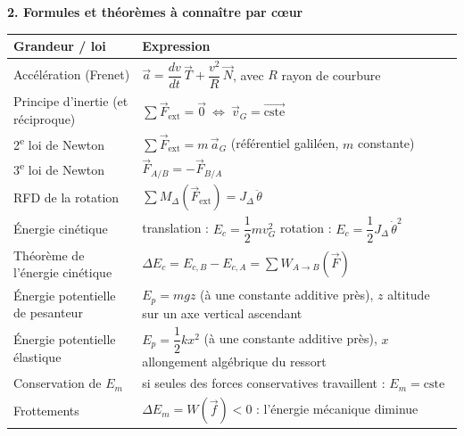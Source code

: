 \documentclass[11pt]{article}
\begin{document}
\begin{aretenir}
\textbf{2. Formules et théorèmes à connaître par c\oe ur}
\begin{center}
\begin{tabularx}{\linewidth}{|l|X|}
\hline
\rowcolor{popblueL} \textbf{Grandeur / loi} & \textbf{Expression} \\
\hline
Accélération (Frenet) & $\vec{a}=\dfrac{dv}{dt}\,\vec{T}+\dfrac{v^2}{R}\,\vec{N}$, avec $R$ rayon de courbure \\
\hline
Principe d'inertie (et réciproque) & $\sum\vec{F}_{\mathrm{ext}}=\vec{0}\ \Longleftrightarrow\ \vec{v}_G=\overrightarrow{\mathrm{cste}}$ \\
\hline
2\textsuperscript{e} loi de Newton & $\sum\vec{F}_{\mathrm{ext}}=m\,\vec{a}_G$ (référentiel galiléen, $m$ constante) \\
\hline
3\textsuperscript{e} loi de Newton & $\vec{F}_{A/B}=-\vec{F}_{B/A}$ \\
\hline
RFD de la rotation & $\sum M_\Delta(\vec{F}_{\mathrm{ext}})=J_\Delta\,\ddot{\theta}$ \\
\hline
Énergie cinétique & translation : $E_c=\dfrac12 m v_G^2$ \quad rotation : $E_c=\dfrac12 J_\Delta\,\dot{\theta}^2$ \\
\hline
Théorème de l'énergie cinétique & $\Delta E_c=E_{c,B}-E_{c,A}=\sum W_{A\to B}(\vec{F})$ \\
\hline
Énergie potentielle de pesanteur & $E_p=m g z$ (à une constante additive près), $z$ altitude sur un axe vertical ascendant \\
\hline
Énergie potentielle élastique & $E_p=\dfrac12 k x^2$ (à une constante additive près), $x$ allongement algébrique du ressort \\
\hline
Conservation de $E_m$ & si seules des forces conservatives travaillent : $E_m=\mathrm{cste}$ \\
\hline
Frottements & $\Delta E_m=W(\vec{f})<0$ : l'énergie mécanique diminue \\
\hline
\end{tabularx}
\end{center}


\end{aretenir}
\end{document}
